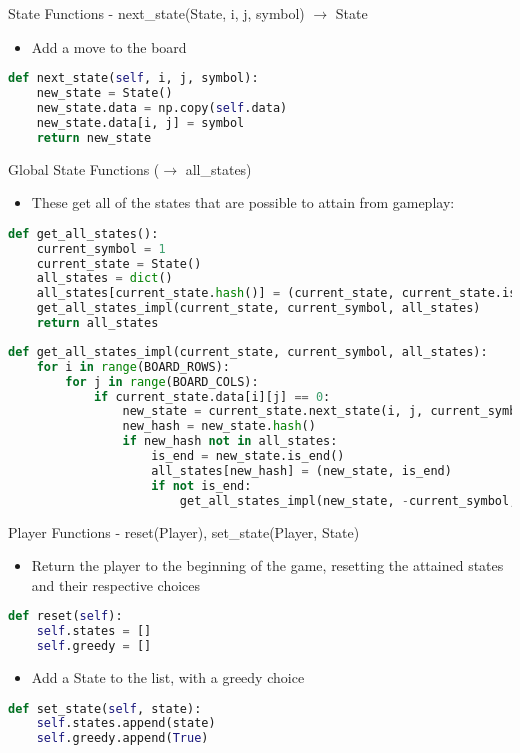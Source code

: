 \documentclass{beamer}
\begin{document}
  \begin{frame}[fragile]{State Functions - next\_state(State, i, j, symbol) $\to$ State}
  	\begin{itemize}
  		\item Add a move to the board
  	\end{itemize}
  	\begin{lstlisting}[language=Python]
def next_state(self, i, j, symbol):
    new_state = State()
    new_state.data = np.copy(self.data)
    new_state.data[i, j] = symbol
    return new_state	
 \end{lstlisting}
  \end{frame}

\begin{frame}[fragile]{Global State Functions ($\to$ all\_states)}
	\begin{itemize}
		\item These get all of the states that are possible to attain from gameplay:
	\end{itemize}
\begin{lstlisting}[language=Python]
def get_all_states():
    current_symbol = 1
    current_state = State()
    all_states = dict()
    all_states[current_state.hash()] = (current_state, current_state.is_end())
    get_all_states_impl(current_state, current_symbol, all_states)
    return all_states
\end{lstlisting}
\begin{lstlisting}[language=Python]
def get_all_states_impl(current_state, current_symbol, all_states):
    for i in range(BOARD_ROWS):
        for j in range(BOARD_COLS):
            if current_state.data[i][j] == 0:
                new_state = current_state.next_state(i, j, current_symbol)
                new_hash = new_state.hash()
                if new_hash not in all_states:
                    is_end = new_state.is_end()
                    all_states[new_hash] = (new_state, is_end)
                    if not is_end:
                        get_all_states_impl(new_state, -current_symbol, all_states)
\end{lstlisting}
\end{frame}
\begin{frame}[fragile]{Player Functions - reset(Player), set\_state(Player, State)}
\begin{itemize}
	\item Return the player to the beginning of the game, resetting the attained states and their respective choices
\end{itemize}
\begin{lstlisting}[language=Python]
def reset(self):
    self.states = []
    self.greedy = []
\end{lstlisting}
\begin{itemize}
	\item Add a State to the list, with a greedy choice
\end{itemize}
\begin{lstlisting}[language=Python]
def set_state(self, state):
    self.states.append(state)
    self.greedy.append(True)
\end{lstlisting}
\end{frame}
\end{document}
